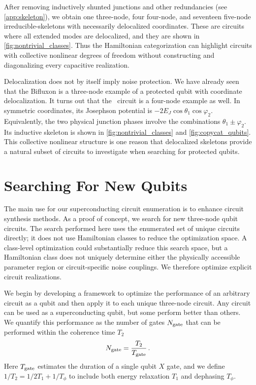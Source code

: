 After removing inductively shunted junctions and other redundancies (see \cref{app:skeleton}), we obtain one three-node, four four-node,
and seventeen five-node irreducible-skeletons with necessarily delocalized
coordinates. These are circuits where all extended modes are delocalized, and they are shown in \cref{fig:nontrivial_classes}. Thus the Hamiltonian categorization can highlight circuits with collective nonlinear degrees of freedom without constructing and diagonalizing every capacitive realization.

Delocalization does not by itself imply noise protection. 
We have already seen that the Bifluxon is a three-node example of a protected qubit with coordinate delocalization. 
It turns out that the \zp\ circuit is a four-node example as well.  
In symmetric coordinates, its Josephson potential is $-2E_J\cos\theta_1\cos\varphi_2$. Equivalently, the two physical junction phases involve the combinations $\theta_1\pm\varphi_2$.
Its inductive skeleton is shown in \cref{fig:nontrivial_classes} and \cref{fig:copycat_qubits}. This collective nonlinear structure is one reason that delocalized skeletons provide a natural subset of circuits to investigate when searching for protected qubits.



\section{Searching For New Qubits}\label{sec:optimization}

The main use for our superconducting circuit enumeration is to enhance circuit synthesis methods. As a proof of concept, we search for new three-node qubit circuits. 
The search performed here uses the enumerated set of unique circuits directly; it does not use Hamiltonian classes to reduce the optimization space. A class-level optimization could substantially reduce this search space, but a Hamiltonian class does not uniquely determine either the physically accessible parameter region or circuit-specific noise couplings. We therefore optimize explicit circuit realizations.

We begin by developing a framework to optimize the performance of an arbitrary circuit as a qubit and then apply it to each unique three-node circuit. Any circuit can be used as a superconducting qubit, but some perform better than others. We quantify this performance as the number of gates $N_{\rm gate}$ that can be performed within the coherence time $T_2$ 
\begin{align}\label{eq:ngate}
N_{\rm gate} = \frac{T_2}{T_{\rm gate}}\,.
\end{align}
Here $T_{\rm gate}$ estimates the duration of a single qubit $X$ gate, and we define $1/T_2 = 1/2T_1 + 1/T_\phi$ to include both energy relaxation $T_1$ and dephasing $T_\phi$.


